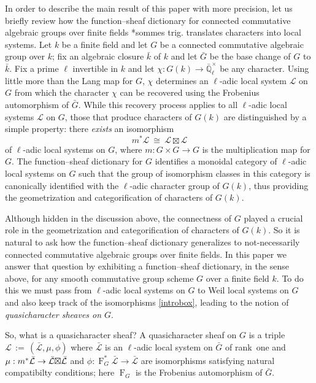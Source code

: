 \documentclass{amsart}
\theoremstyle{plain}
\theoremstyle{definition}
\theoremstyle{remark}
\newcommand{\EE}{\mathbb{\bar Q}_\ell}
\newcommand{\bFq}{\bar{k}}
\newcommand{\Fq}{k}
\newcommand{\EEx}{\EE^\times}
\newcommand{\Frob}[1]{\operatorname{F}_{#1}}
\newcommand{\ceq}{{\, :=\, }}
\newcommand{\iso}{{\ \cong\ }}
\newcommand{\qcs}[1]{{\mathcal{#1}}}
\newcommand{\gqcs}[1]{{\mathcal{\bar #1}}}
\newcommand{\bG}{\bar{G}}
\newcommand{\tight}[3]{\hspace{-#1pt}{#2}\hspace{-#3pt}}
\newcommand{\LxL}{\text{$\gqcs{L} \tight{0}{\boxtimes}{0} \gqcs{L}$}}
\begin{document}
In order to describe the main result of this paper with more precision, let us briefly review how the function--sheaf dictionary for connected commutative algebraic groups over finite fields \cite{deligne:SGA4.5}*{sommes trig.} translates characters into local systems.
Let $\Fq$ be a finite field and let $G$ be a connected commutative algebraic group over $\Fq$; fix an algebraic closure $\bFq$ of $\Fq$
and let $\bG$ be the base change of $G$ to $\bFq$.
Fix a prime $\ell$ invertible in $\Fq$ and let $\chi : G(\Fq) \to \EEx$ be any character.
Using little more than the Lang map for $G$, $\chi$ determines an $\ell$-adic local system $\qcs{L}$ on $G$ from which the character $\chi$ can be recovered using the Frobenius automorphism of $\bG$.
While this recovery process applies to all $\ell$-adic local systems $\qcs{L}$ on $G$, those that produce characters of $G(\Fq)$ are distinguished by a simple property: there \emph{exists} an isomorphism
\begin{equation}\label{introbox}
m^* \qcs{L} \iso \qcs{L} \boxtimes \qcs{L}
\end{equation}
 of $\ell$-adic local systems on $G$, where $m : G\times G \to G$ is the multiplication map for $G$. The function--sheaf dictionary for $G$ identifies a monoidal category of $\ell$-adic local systems on $G$ such that the group of isomorphism classes in this category is canonically identified with the $\ell$-adic character group of $G(\Fq)$, thus providing the geometrization and categorification of characters of $G(\Fq)$.

Although hidden in the discussion above, the connectness of $G$ played a crucial role in the geometrization and categorification of characters of $G(\Fq)$.  So it is natural to ask how the function--sheaf dictionary generalizes to not-necessarily connected commutative algebraic groups over finite fields. In this paper we answer that question by exhibiting a function--sheaf dictionary, in the sense above, for any smooth commutative group scheme $G$ over a finite field $\Fq$.
To do this we must pass from $\ell$-adic local systems on $G$ to Weil local systems on $G$
and also keep track of the isomorphisms \eqref{introbox}, leading to the notion of {\it quasicharacter sheaves on $G$}.

So, what is a quasicharacter sheaf?
A quasicharacter sheaf on $G$ is a triple $\qcs{L}\ceq
(\gqcs{L},\mu,\phi)$ where $\gqcs{L}$ is an $\ell$-adic local system on $\bG$ of rank~one and $\mu: m^*
\gqcs{L} \to \LxL$ and $\phi : \Frob{G}^*\gqcs{L} \to \gqcs{L}$ are isomorphisms satisfying natural compatibilty conditions; here $\Frob{G}$ is the Frobenius automorphism of ${\bar G}$.
\end{document}
